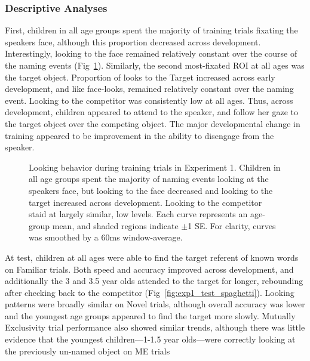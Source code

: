 \documentclass[man,floatsintext]{apa6}
\begin{document}
\subsubsection{Descriptive Analyses}

First, children in all age groups spent the majority of training trials fixating the speakers face, although this proportion decreased across development. Interestingly, looking to the face remained relatively constant over the course of the naming events (Fig~\ref{fig:exp1_train_spaghetti}). Similarly, the second most-fixated ROI at all ages was the target object. Proportion of looks to the Target increased across early development, and like face-looks, remained relatively constant over the naming event. Looking to the competitor was consistently low at all ages. Thus, across development, children appeared to attend to the speaker, and follow her gaze to the target object over the competing object. The major developmental change in training appeared to be improvement in the ability to disengage from the speaker.

\begin{figure}[tb]
	\caption{\label{fig:exp1_train_spaghetti} Looking behavior during training trials in Experiment 1. Children in all age groups spent the majority of naming events looking at the speakers face, but looking to the face decreased and looking to the target increased across development. Looking to the competitor staid at largely similar, low levels. Each curve represents an age-group mean, and shaded regions indicate $\pm$1 SE. For clarity, curves was smoothed by a 60ms window-average.}
\end{figure}

At test, children at all ages were able to find the target referent of known words on Familiar trials. Both speed and accuracy improved across development, and additionally the 3 and 3.5 year olds attended to the target for longer, rebounding after checking back to the competitor (Fig~\ref{fig:exp1_test_spaghetti}). Looking patterns were broadly similar on Novel trials, although overall accuracy was lower and the youngest age groups appeared to find the target more slowly. Mutually Exclusivity trial performance also showed similar trends, although there was little evidence that the youngest children---1-1.5 year olds---were correctly looking at the previously un-named object on ME trials
\end{document}
